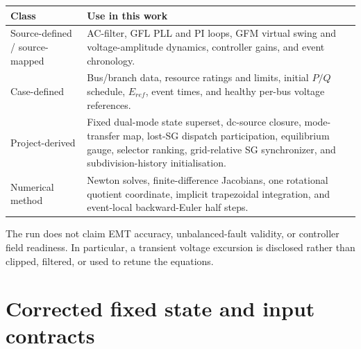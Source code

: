 \documentclass[12pt,a4paper]{article}
\begin{document}
\begingroup\small\noindent
\begin{tabularx}{\textwidth}{@{}>{\raggedright\arraybackslash}p{}X@{}}
\toprule
Class & Use in this work \\ \midrule
Source-defined / source-mapped & AC-filter, GFL PLL and PI loops, GFM virtual swing and voltage-amplitude dynamics, controller gains, and event chronology. \\
Case-defined & Bus/branch data, resource ratings and limits, initial $P/Q$ schedule, $E_{ref}$, event times, and healthy per-bus voltage references. \\
Project-derived & Fixed dual-mode state superset, dc-source closure, mode-transfer map, lost-SG dispatch participation, equilibrium gauge, selector ranking, grid-relative SG synchronizer, and subdivision-history initialisation. \\
Numerical method & Newton solves, finite-difference Jacobians, one rotational quotient coordinate, implicit trapezoidal integration, and event-local backward-Euler half steps. \\
\bottomrule
\end{tabularx}
\endgroup

The run does not claim EMT accuracy, unbalanced-fault validity, or controller field readiness.
In particular, a transient voltage excursion is disclosed rather than clipped, filtered, or used
to retune the equations.

\section{Corrected fixed state and input contracts}
\end{document}
